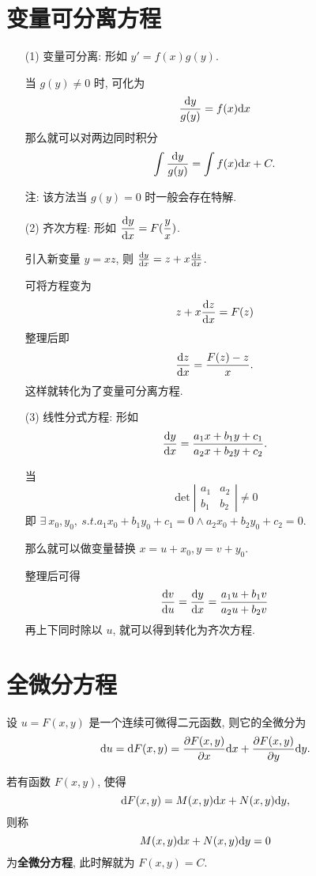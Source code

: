 \section{变量可分离方程}
\begin{itemize}[leftmargin=1.5cm]
	\item[(1)]变量可分离:
	形如 $y'=f(x)g(y)$.
	
	当 $g(y)\neq0$ 时, 可化为 $$\dfrac{\text {d} y}{g(y)}=f(x) \text {d} x$$ 那么就可以对两边同时积分 $$\int\dfrac{\text {d} y}{g(y)}=\int f(x)\text {d} x + C.$$
	
	注: 该方法当 $g(y)=0$ 时一般会存在特解.
	
	\item[(2)]齐次方程: 形如 $\dfrac{\text {d} y}{\text {d} x}=F(\dfrac{y}{x})$.
	
	引入新变量 $y=xz$, 则 $\frac{\text {d} y}{\text {d} x}=z+x\frac{\text {d} z}{\text {d} x}$.
	
	可将方程变为 $$z+x\frac{\text {d} z}{\text {d} x}=F(z)$$ 整理后即 $$\frac{\text {d} z}{\text {d} x}=\frac{F(z)-z}{x}.$$
	这样就转化为了变量可分离方程.
	
	\item[(3)] 线性分式方程: 形如 $$\frac{\text {d} y}{\text {d} x}=\frac{a_1x+b_1y+c_1}{a_2x+b_2y+c_2}.$$
	
	当 $$\det\left|
	\begin{array}{cc}
		a_1 & a_2 \\
		b_1 & b_2
	\end{array}
	\right|\neq 0$$ 即 $\exists\ x_0,y_0,\ s.t. a_1x_0+b_1y_0+c_1=0 \wedge a_2x_0+b_2y_0+c_2=0$.
	
	那么就可以做变量替换 $x=u+x_0,y=v+y_0$.
	
	整理后可得 $$\frac{\text {d} v}{\text {d} u}=\frac{\text {d} y}{\text {d} x}=\frac{a_1u+b_1v}{a_2u+b_2v}$$ 再上下同时除以 $u$, 就可以得到转化为齐次方程.
\end{itemize}

\section{全微分方程}

\begin{definition}
	设 $u=F(x,y)$ 是一个连续可微得二元函数, 则它的全微分为 $$\text {d} u=\text {d} F(x,y)=\frac{\partial F(x,y)}{\partial x}\text {d} x+\frac{\partial F(x,y)}{\partial y}\text {d} y.$$
\end{definition}

\begin{definition}
	若有函数 $F(x,y)$, 使得 $$\text {d} F(x,y)=M(x,y)\text {d} x+N(x,y)\text {d} y,$$ 则称 $$M(x,y)\text {d} x+N(x,y)\text {d} y=0$$ 为\textbf{全微分方程}, 此时解就为 $F(x,y)=C$.
\end{definition}

